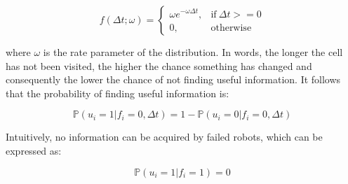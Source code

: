 \documentclass[letterpaper, 10 pt, conference]{ieeeconf}
\begin{document}
\begin{equation}
    f(\Delta t;\omega) = 
    \begin{cases}
        \omega e^{-\omega\Delta t}, & \text{if}\ \Delta t >= 0\\
        0, & \text{otherwise}
    \end{cases}
    \label{eq:information}
\end{equation}

where $\omega$ is the rate parameter of the distribution. In words,
the longer the cell has not been visited, the higher the chance
something has changed and consequently the lower the chance of not
finding useful information. It follows that the probability of finding
useful information is:

\begin{equation}
    \mathbb{P}(u_i=1 | f_i=0, \Delta t) = 1 - \mathbb{P}(u_i=0 | f_i=0, \Delta t)
    \label{eq:usefulInformation}
\end{equation}

Intuitively, no information can be acquired by failed robots, which
can be expressed as:

\begin{equation}
    \mathbb{P}(u_i=1 | f_i=1) = 0
    \label{eq:informationFailure}
\end{equation}
\end{document}
